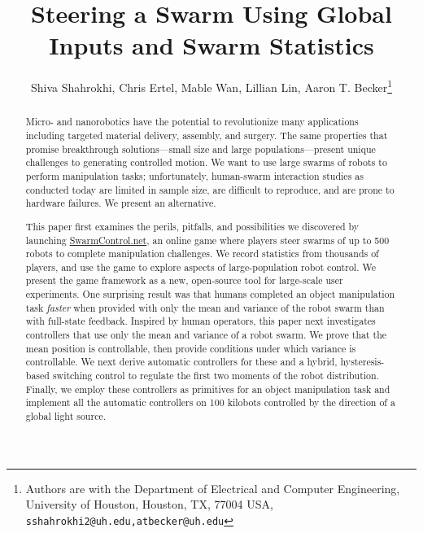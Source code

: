\documentclass[11pt]{article}
\begin{document}
    \tableofcontents
    \setcounter{tocdepth}{3}
    \newpage
 

\title{\LARGE \bf Steering a Swarm Using Global Inputs and Swarm Statistics}

\author{Shiva Shahrokhi, Chris Ertel, Mable Wan, Lillian Lin, Aaron T. Becker\thanks{Authors are with the Department of Electrical and Computer Engineering, University of Houston, Houston, TX, 77004 USA, {\tt\small sshahrokhi2@uh.edu,atbecker@uh.edu}}
} %
\maketitle
\begin{abstract}
Micro- and nanorobotics have the potential to revolutionize many applications including targeted material delivery, assembly, and surgery.  The same properties that promise breakthrough solutions---small size and large populations---present unique challenges to generating controlled motion. We want to use large swarms of robots to perform manipulation tasks; unfortunately, human-swarm interaction studies as conducted today are limited in sample size, are difficult to reproduce, and are prone to hardware failures. We present an alternative.

This paper first examines the perils, pitfalls, and possibilities we discovered by launching \href{http://www.swarmcontrol.net}{SwarmControl.net}, an online game where players steer swarms of up to 500 robots to complete manipulation challenges. We record statistics from thousands of players, and use the game to explore aspects of large-population robot control. We present the game framework as a new, open-source tool for large-scale user experiments. One surprising result was that humans completed an object manipulation task \emph{faster} when provided with only the mean and variance of the robot swarm than with full-state feedback. Inspired by human operators, this paper next investigates controllers that use only the mean and variance of a robot swarm. We prove that the mean position is controllable, then provide conditions under which variance is controllable.  We next derive automatic controllers for these and a hybrid, hysteresis-based switching control to regulate the first two moments of the robot distribution.  Finally, we employ these controllers as primitives for an object manipulation task and implement all the automatic controllers on 100 kilobots controlled by the direction of a global light source.
\end{abstract}
%









    
\end{document}

